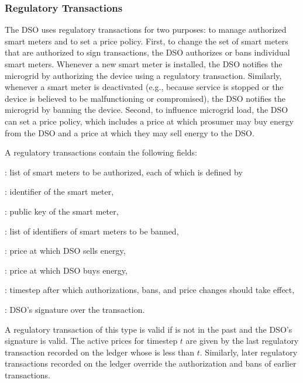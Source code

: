 \subsubsection{Regulatory Transactions}

The DSO uses regulatory transactions for two purposes: to manage authorized smart meters and to set a price policy.
First, to change the set of smart meters that are authorized to sign transactions, the DSO authorizes or bans individual smart meters.
Whenever a new smart meter is installed, the DSO notifies the microgrid by authorizing the device using a regulatory transaction.
Similarly, whenever a smart meter is deactivated (e.g., because service is stopped or the device is believed to be malfunctioning or compromised), the DSO notifies the microgrid by banning the device.
Second, to influence microgrid load, the DSO can set a price policy, which includes a price at which prosumer may buy energy from the DSO and a price at which they may sell energy to the DSO.

A regulatory transactions contain the following fields:
\begin{compactitem}
\item {}: list of smart meters to be authorized, each of which is defined by
\begin{compactitem}
\item {}: identifier of the smart meter,
\item {}: public key of the smart meter,
\end{compactitem}
\item {}: list of identifiers of smart meters to be banned, 
\item {}: price at which DSO sells energy,
\item {}: price at which DSO buys energy,
\item {}: timestep after which authorizations, bans, and price changes should take effect,
\item {}: DSO's signature over the transaction.
\end{compactitem}

A regulatory transaction of this type is valid if %
{} is not in the past and %
the DSO's signature is valid.
%
The active prices for timestep $t$ are given by the last regulatory transaction recorded on the ledger whose  is less than $t$.
Similarly, later regulatory transactions recorded on the ledger override the authorization and bans of earlier transactions.

